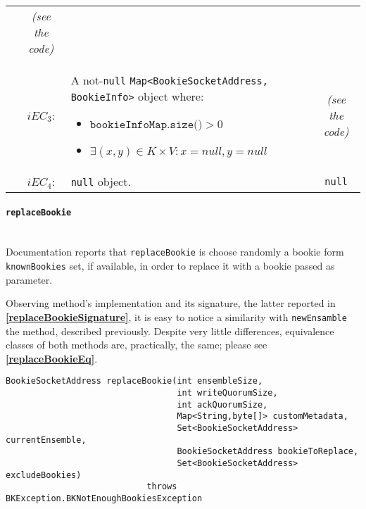 \documentclass[sigconf]{acmart}
\begin{document}
\begin{table*}
\begin{tabular}{l|cm{10.5cm}|c}
& \textit{(see the code)} 

\\\cline{2-4}  

& $iEC_3$: & A not-\texttt{null} \texttt{Map<BookieSocketAddress, BookieInfo>} object where:
	
\begin{itemize}
\item $\texttt{bookieInfoMap.size()} > 0$
\item $\exists (x,y) \in K \times V : x = null, y = null$
\end{itemize}

& \textit{(see the code)} 

\\\cline{2-4}  

& $iEC_4$: & \texttt{null} object. & \texttt{null} 
    
\\
\bottomrule
\end{tabular}
\end{table*}

\paragraph{\texttt{replaceBookie}}
\hfill\\
Documentation reports that \texttt{replaceBookie} is choose randomly a bookie form \texttt{knownBookies} set, if available, in order to replace it with a bookie passed as parameter. 

Observing method's implementation and its signature, the latter reported in \textbf{\cref{replaceBookieSignature}}, it is easy to notice a similarity with \texttt{newEnsamble} the method, described previously. Despite very little differences, equivalence classes of both methods are, practically, the same; please see \textbf{\cref{replaceBookieEq}}.

\begin{lstlisting}[frame=lines,basicstyle=\ttfamily\tiny, caption={Signature of method \texttt{replaceBookie}}, label={replaceBookieSignature}]
BookieSocketAddress replaceBookie(int ensembleSize,
                                  int writeQuorumSize,
                                  int ackQuorumSize,
                                  Map<String,byte[]> customMetadata,
                                  Set<BookieSocketAddress> currentEnsemble,
                                  BookieSocketAddress bookieToReplace,
                                  Set<BookieSocketAddress> excludeBookies)
                            throws BKException.BKNotEnoughBookiesException
\end{lstlisting}
\end{document}

